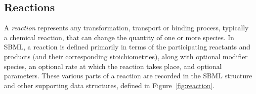 \subsection{Reactions}
\label{sec:reactions}

A \emph{reaction} represents any transformation, transport or
binding process, typically a chemical reaction, that can change
the quantity of one or more species.  In SBML, a reaction is
defined primarily in terms of the participating reactants and
products (and their corresponding stoichiometries), along with
optional modifier species, an optional rate at which the reaction
takes place, and optional parameters.  These various parts of a
reaction are recorded in the SBML \Reaction structure and other
supporting data structures, defined in Figure~\vref{fig:reaction}.

